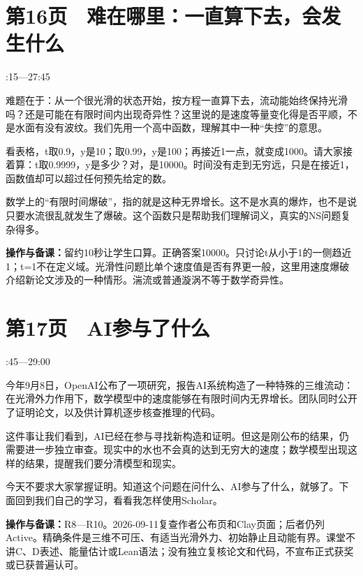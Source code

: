\documentclass[UTF8,a4paper,11pt,fontset=fandol]{ctexart}
\newcommand{\tip}[1]{\par{\small\color{black!65}\noindent\textbf{操作与备课：}#1\par}}
\begin{document}
\par\noindent\begin{minipage}{\linewidth}

\section*{第16页　难在哪里：一直算下去，会发生什么}

{\small{}:15—27:45\par}

难题在于：从一个很光滑的状态开始，按方程一直算下去，流动能始终保持光滑吗？还是可能在有限时间内出现奇异性？这里说的是速度等量变化得是否平顺，不是水面有没有波纹。我们先用一个高中函数，理解其中一种“失控”的意思。

看表格，t取0.9，y是10；取0.99，y是100；再接近1一点，就变成1000。请大家接着算：t取0.9999，y是多少？对，是10000。时间没有走到无穷远，只是在接近1，函数值却可以超过任何预先给定的数。

数学上的“有限时间爆破”，指的就是这种无界增长。这不是水真的爆炸，也不是说只要水流很乱就发生了爆破。这个函数只是帮助我们理解词义，真实的NS问题复杂得多。

\tip{留约10秒让学生口算。正确答案10000。只讨论t从小于1的一侧趋近1；t=1不在定义域。光滑性问题比单个速度值是否有界更一般，这里用速度爆破介绍新论文涉及的一种情形。湍流或普通漩涡不等于数学奇异性。}

\end{minipage}\par\vspace{2mm}

\par\noindent\begin{minipage}{\linewidth}

\section*{第17页　AI参与了什么}

{\small{}:45—29:00\par}

今年9月8日，OpenAI公布了一项研究，报告AI系统构造了一种特殊的三维流动：在光滑外力作用下，数学模型中的速度能够在有限时间内无界增长。团队同时公开了证明论文，以及供计算机逐步核查推理的代码。

这件事让我们看到，AI已经在参与寻找新构造和证明。但这是刚公布的结果，仍需要进一步独立审查。现实中的水也不会真的达到无穷大的速度；数学模型出现这样的结果，提醒我们要分清模型和现实。

今天不要求大家掌握证明。知道这个问题在问什么、AI参与了什么，就够了。下面回到我们自己的学习，看看我怎样使用Scholar。

\tip{R8—R10。2026-09-11复查作者公布页和Clay页面；后者仍列Active。精确条件是三维不可压、有适当光滑外力、初始静止且动能有界。课堂不讲C、D表述、能量估计或Lean语法；没有独立复核论文和代码，不宣布正式获奖或已获普遍认可。}

\end{minipage}\par\vspace{2mm}
\end{document}

